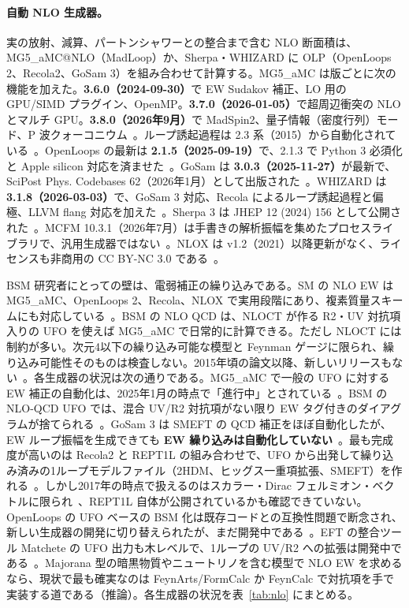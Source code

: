 \documentclass[a4paper,10pt]{ltjsarticle}
\begin{document}
\paragraph{自動 NLO 生成器。}実の放射、減算、パートンシャワーとの整合まで含む NLO 断面積は、MG5\_aMC@NLO（MadLoop）か、Sherpa・WHIZARD に OLP（OpenLoops 2、Recola2、GoSam 3）を組み合わせて計算する。MG5\_aMC は版ごとに次の機能を加えた。\textbf{3.6.0（2024-09-30）}で EW Sudakov 補正、LO 用の GPU/SIMD プラグイン、OpenMP。\textbf{3.7.0（2026-01-05）}で超周辺衝突の NLO とマルチ GPU。\textbf{3.8.0（2026年9月）}で MadSpin2、量子情報（密度行列）モード、P 波クォーコニウム~\cite{r55,r56}。ループ誘起過程は 2.3 系（2015）から自動化されている~\cite{r57}。OpenLoops の最新は \textbf{2.1.5（2025-09-19）}で、2.1.3 で Python 3 必須化と Apple silicon 対応を済ませた~\cite{r52}。GoSam は \textbf{3.0.3（2025-11-27）}が最新で、SciPost Phys. Codebases 62（2026年1月）として出版された~\cite{r58,r59}。WHIZARD は \textbf{3.1.8（2026-03-03）}で、GoSam 3 対応、Recola によるループ誘起過程と偏極、LLVM flang 対応を加えた~\cite{r60}。Sherpa 3 は JHEP 12 (2024) 156 として公開された~\cite{r61}。MCFM 10.3.1（2026年7月）は手書きの解析振幅を集めたプロセスライブラリで、汎用生成器ではない~\cite{r62}。NLOX は v1.2（2021）以降更新がなく、ライセンスも非商用の CC BY-NC 3.0 である~\cite{r63}。

BSM 研究者にとっての壁は、電弱補正の繰り込みである。SM の NLO EW は MG5\_aMC、OpenLoops 2、Recola、NLOX で実用段階にあり、複素質量スキームにも対応している~\cite{r64,r51}。BSM の NLO QCD は、NLOCT が作る R2・UV 対抗項入りの UFO を使えば MG5\_aMC で日常的に計算できる。ただし NLOCT には制約が多い。次元4以下の繰り込み可能な模型と Feynman ゲージに限られ、繰り込み可能性そのものは検査しない。2015年頃の論文以降、新しいリリースもない~\cite{r65}。各生成器の状況は次の通りである。MG5\_aMC で一般の UFO に対する EW 補正の自動化は、2025年1月の時点で「進行中」とされている~\cite{r66}。BSM の NLO-QCD UFO では、混合 UV/R2 対抗項がない限り EW タグ付きのダイアグラムが捨てられる~\cite{r67}。GoSam 3 は SMEFT の QCD 補正をほぼ自動化したが、EW ループ振幅を生成できても \textbf{EW 繰り込みは自動化していない}~\cite{r68}。最も完成度が高いのは Recola2 と REPT1L の組み合わせで、UFO から出発して繰り込み済みの1ループモデルファイル（2HDM、ヒッグス一重項拡張、SMEFT）を作れる~\cite{r69}。しかし2017年の時点で扱えるのはスカラー・Dirac フェルミオン・ベクトルに限られ~\cite{r70}、REPT1L 自体が公開されているかも確認できていない。OpenLoops の UFO ベースの BSM 化は既存コードとの互換性問題で断念され、新しい生成器の開発に切り替えられたが、まだ開発中である~\cite{r71}。EFT の整合ツール Matchete の UFO 出力も木レベルで、1ループの UV/R2 への拡張は開発中である~\cite{r72}。Majorana 型の暗黒物質やニュートリノを含む模型で NLO EW を求めるなら、現状で最も確実なのは FeynArts/FormCalc か FeynCalc で対抗項を手で実装する道である（推論）。各生成器の状況を表~\ref{tab:nlo} にまとめる。
\end{document}

